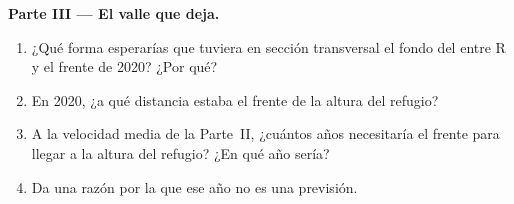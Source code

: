 \begin{problem}
\noindent\textbf{Parte III --- El valle que deja.}\par\nopagebreak
\begin{enumerate}[resume, beginpenalty=10000]
  \item ¿Qué forma esperarías que tuviera en sección transversal el fondo
        del  entre R y el frente de 2020? ¿Por qué?
  \item En 2020, ¿a qué distancia estaba el frente de la altura del refugio?
  \item A la velocidad media de la Parte~II, ¿cuántos años necesitaría el
        frente para llegar a la altura del refugio? ¿En qué año sería?
  \item Da una razón por la que ese año no es una previsión.
\end{enumerate}
\end{problem}
